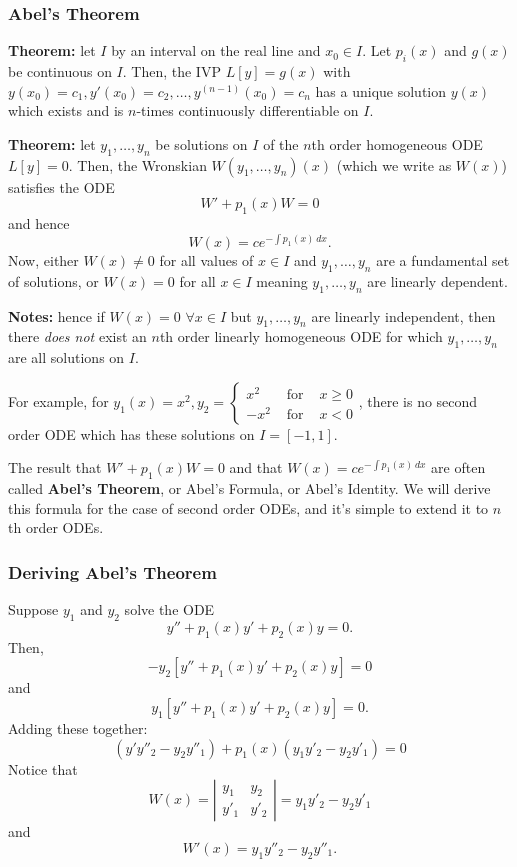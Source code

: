 \documentclass[11pt]{article}
\newcommand{\dx}{\,dx} %
\begin{document}
\subsubsection{Abel's Theorem}
	\textbf{Theorem:} let $I$ by an interval on the real line and $x_0 \in I$. Let $p_i (x)$ and $g(x)$ be continuous on $I$. Then, the IVP $L[y] = g(x)$ with $y(x_0) = c_1, y'(x_0) = c_2, \ldots, y^{(n-1)} (x_0) = c_n$ has a unique solution $y(x)$ which exists and is $n$-times continuously differentiable on $I$.

	\textbf{Theorem:} let $y_1, \ldots, y_n$ be solutions on $I$ of the $n$th order homogeneous ODE $L[y] = 0$. Then, the Wronskian $W(y_1, \ldots, y_n)(x)$ (which we write as $W(x)$) satisfies the ODE
		$$ W' + p_1(x) W = 0 $$
	and hence
		$$ W(x) = ce^{- \int p_1(x)\dx}. $$
	Now, either $W(x) \neq 0$ for all values of $x \in I$ and $y_1, \ldots, y_n$ are a fundamental set of solutions, or $W(x) = 0$ for all $x \in I$ meaning $y_1, \ldots, y_n$ are linearly dependent.

	\textbf{Notes:} hence if $W(x) = 0$ $\forall x \in I$ but $y_1, \ldots, y_n$ are linearly independent, then there \emph{does not} exist an $n$th order linearly homogeneous ODE for which $y_1, \ldots, y_n$ are all solutions on $I$.

	For example, for $y_1 (x) = x^2, y_2 = \left\{ \begin{array}{ccc} x^2 & \text{ for } & x \geq 0 \\ - x^2 & \text{ for } & x < 0 \end{array} \right. $, there is no second order ODE which has these solutions on $I = [-1,1]$.

	The result that $W' + p_1 (x) W = 0$ and that $W(x) = ce^{- \int p_1(x)\dx}$ are often called \textbf{Abel's Theorem}, or Abel's Formula, or Abel's Identity. We will derive this formula for the case of second order ODEs, and it's simple to extend it to $n$th order ODEs.

\subsubsection{Deriving Abel's Theorem}
	Suppose $y_1$ and $y_2$ solve the ODE
		$$ y'' + p_1 (x) y' + p_2(x) y = 0. $$
	Then,
		$$ -y_2 [y'' + p_1 (x) y' + p_2(x) y] = 0 $$
	and
		$$ y_1 [y'' + p_1 (x) y' + p_2(x) y] = 0. $$
	Adding these together:
		$$ (y' y''_2 - y_2 y''_1) + p_1 (x) (y_1 y'_2 - y_2 y'_1) = 0 $$
	Notice that
		$$ W(x) = \left| \begin{array}{cc} y_1 & y_2 \\ y'_1 & y'_2 \end{array} \right| = y_1 y'_2 - y_2 y'_1 $$
	and
		$$ W'(x) = y_1 y''_2 - y_2 y''_1. $$
\end{document}
